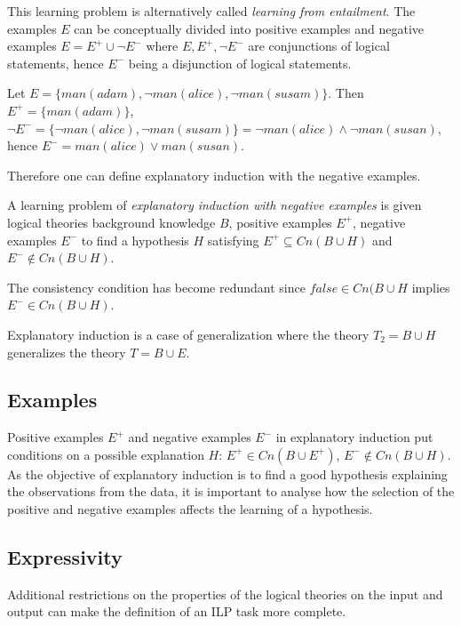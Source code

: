 This learning problem is alternatively called \emph{learning from entailment}\cite{muggleton1995inverse}\cite{de1997logical}. The examples $E$ can be conceptually divided into positive examples and negative examples $E=E^{+} \cup \neg E^{-}$ where $E, E^{+}, \neg E^{-}$ are conjunctions of logical statements, hence $E^{-}$ being a disjunction of logical statements.

\begin{exmp}\cite{explanatory_induction_example}
Let $E=\{man(adam), \neg man(alice), \neg man(susam)\}$. Then $E^{+}=\{man(adam)\}$,
$\neg E^{-} = \{\neg man(alice), \neg man(susam)\}=\neg man(alice) \land \neg man(susan)$, hence
$E^{-} = man(alice) \lor man(susan)$.
\end{exmp}

Therefore one can define explanatory induction with the negative examples.
\begin{defn}\label{explanatory_induction_with_negative_examples_definition}
A learning problem of \emph{explanatory induction with negative examples} is given logical theories background knowledge $B$, positive examples $E^{+}$, negative examples $E^{-}$ to find a hypothesis $H$ satisfying
$E^{+} \subseteq Cn(B \cup H)$ and $E^{-} \not\in Cn(B \cup H)$.
\end{defn}
The consistency condition has become redundant since $false \in Cn(B \cup H$ implies $E^{-} \in Cn(B \cup H)$.

Explanatory induction is a case of generalization where the theory $T_2=B \cup H$ generalizes the theory $T = B \cup E$.

\subsection{Examples}
Positive examples $E^{+}$ and negative examples $E^{-}$ in explanatory induction put conditions on a possible explanation $H$: $E^{+} \in Cn(B \cup E^{+})$, $E^{-} \not \in Cn(B \cup H)$. As the objective of explanatory induction is to find a good hypothesis explaining the observations from the data, it is important to analyse how the selection of the positive and negative examples affects the learning of a hypothesis.

\subsection{Expressivity}
Additional restrictions on the properties of the logical theories on the input and output can make the definition of an ILP task more complete.

